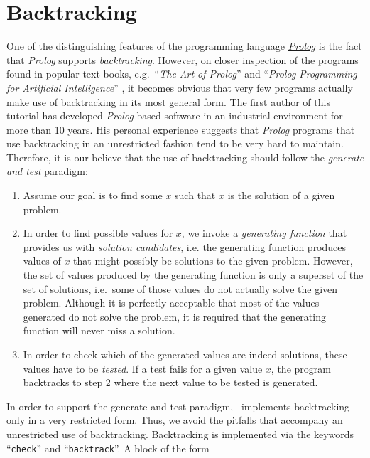 \section{Backtracking}
One of the distinguishing features of the programming language 
\href{http://en.wikipedia.org/wiki/Prolog}{\textsl{Prolog}}
is the fact that \textsl{Prolog} supports 
\href{http://en.wikipedia.org/wiki/Backtracking}{\emph{backtracking}}.  
However, on closer inspection of the programs found in popular text books, e.g.~``\emph{The Art of Prolog}''
\cite{sterling86} and ``\emph{Prolog Programming for Artificial Intelligence}'' \cite{bratko:90}, it
becomes obvious that very few programs actually make use of 
backtracking in its most general form.   The first author of this tutorial has developed
\textsl{Prolog} based software in an industrial environment for more than 10 years.  His personal
experience suggests that \textsl{Prolog} programs that use backtracking in an unrestricted fashion
tend to be very hard to maintain.   
Therefore, it is our believe that the use of backtracking should follow the
\emph{generate and test} paradigm:
\begin{enumerate}
\item Assume our goal is to find some $x$ such that $x$ is the solution of a given problem.
\item In order to find possible values for $x$, we invoke a \emph{generating function} that provides
      us with \emph{solution candidates}, i.e. the generating function produces values of $x$ that
      might possibly be solutions to the given problem.  However, the set of values produced by the generating
      function is only a superset of the set of solutions, i.e.~some of those values do not actually
      solve the given problem.  Although it is perfectly acceptable that most of the values generated do not solve
      the problem, it is required that the generating function will never miss a solution.
\item In order to check which of the generated values are indeed solutions, these values
      have to be \emph{tested}.  If a test fails for a given value $x$, the program backtracks to
      step 2 where the next value to be tested is generated. 
\end{enumerate}
In order to support the generate and test paradigm,  \setlx\ 
implements backtracking only in a very restricted form.  Thus, we avoid the
pitfalls that accompany an unrestricted use of backtracking.
Backtracking is implemented  via the keywords ``\texttt{check}'' and
``\texttt{backtrack}''.  A block of the form
